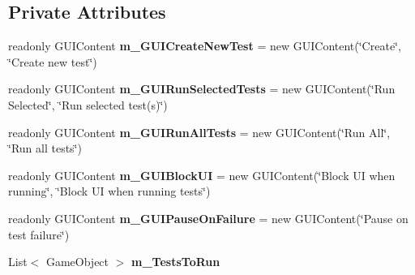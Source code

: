 \subsection*{Private Attributes}
\begin{DoxyCompactItemize}
\item 
\mbox{\label{class_unity_test_1_1_integration_tests_runner_window_a3d1d93e6b25497fd404d14f73d2a1710}} 
readonly G\+U\+I\+Content {\bfseries m\+\_\+\+G\+U\+I\+Create\+New\+Test} = new G\+U\+I\+Content(\char`\"{}Create\char`\"{}, \char`\"{}Create new test\char`\"{})
\item 
\mbox{\label{class_unity_test_1_1_integration_tests_runner_window_a355f6b830d1a7aea1396849c715ccd8a}} 
readonly G\+U\+I\+Content {\bfseries m\+\_\+\+G\+U\+I\+Run\+Selected\+Tests} = new G\+U\+I\+Content(\char`\"{}Run Selected\char`\"{}, \char`\"{}Run selected test(s)\char`\"{})
\item 
\mbox{\label{class_unity_test_1_1_integration_tests_runner_window_aa179172066139de31c30888c33cf7527}} 
readonly G\+U\+I\+Content {\bfseries m\+\_\+\+G\+U\+I\+Run\+All\+Tests} = new G\+U\+I\+Content(\char`\"{}Run All\char`\"{}, \char`\"{}Run all tests\char`\"{})
\item 
\mbox{\label{class_unity_test_1_1_integration_tests_runner_window_ae262e62d97662496fbc3525e515eec6a}} 
readonly G\+U\+I\+Content {\bfseries m\+\_\+\+G\+U\+I\+Block\+UI} = new G\+U\+I\+Content(\char`\"{}Block UI when running\char`\"{}, \char`\"{}Block UI when running tests\char`\"{})
\item 
\mbox{\label{class_unity_test_1_1_integration_tests_runner_window_a9f34e19427d471d728281fc1af5d5d39}} 
readonly G\+U\+I\+Content {\bfseries m\+\_\+\+G\+U\+I\+Pause\+On\+Failure} = new G\+U\+I\+Content(\char`\"{}Pause on test failure\char`\"{})
\item 
\mbox{\label{class_unity_test_1_1_integration_tests_runner_window_ac527aed938a069b55b348dd74dd3b63f}} 
List$<$ Game\+Object $>$ {\bfseries m\+\_\+\+Tests\+To\+Run}

\end{DoxyCompactItemize}
